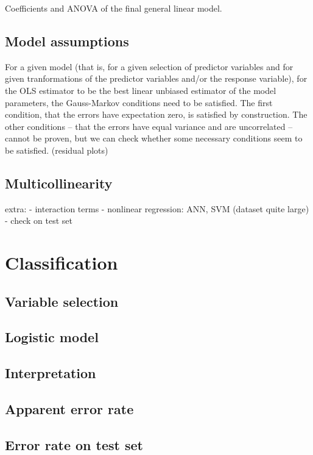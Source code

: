 \documentclass[a4paper, 12pt]{article}
\newcommand{\wide}[1]{\makebox[\textwidth][c]{#1}%
}
\begin{document}
\begin{table}
\centering
\wide{}
\caption{Coefficients and ANOVA of the final general linear model.}
\end{table}


\subsection*{Model assumptions}

For a given model (that is, for a given selection of predictor variables and for given tranformations of the predictor variables and/or the response variable), for the OLS estimator to be the best linear unbiased estimator of the model parameters, the Gauss-Markov conditions need to be satisfied. The first condition, that the errors have expectation zero, is satisfied by construction. The other conditions -- that the errors have equal variance and are uncorrelated -- cannot be proven, but we can check whether some necessary conditions seem to be satisfied.
(residual plots)

\subsection*{Multicollinearity}

extra:
- interaction terms
- nonlinear regression: ANN, SVM (dataset quite large)
- check on test set

\section{Classification}
\subsection*{Variable selection}
\subsection*{Logistic model}
\subsection*{Interpretation}
\subsection*{Apparent error rate}
\subsection*{Error rate on test set}
\end{document}
